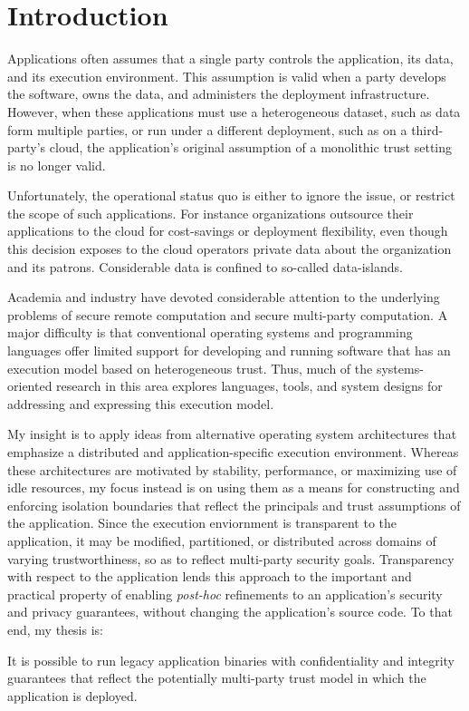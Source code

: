 \section{Introduction}
\label{sec:intro}

Applications often assumes that a single party controls the application, its
data, and its execution environment.
%
This assumption is valid when a party develops the software, owns the data, 
and administers the deployment infrastructure.
%
However, when these applications must use a heterogeneous dataset,
such as data form multiple parties, or run under a different deployment, such
as on a third-party's cloud, the application's original assumption of a
monolithic trust setting is no longer valid.


Unfortunately, the operational status quo is either to ignore the issue, or
restrict the scope of such applications.  
%
For instance organizations outsource their applications to the cloud for
cost-savings or deployment flexibility, even though this decision exposes to
the cloud operators private data about the organization and its patrons.
%
Considerable data is confined to so-called data-islands.



Academia and industry have devoted considerable attention to the underlying
problems of secure remote computation and secure multi-party computation.
%
A major difficulty is that conventional operating systems and
programming languages offer limited support for developing and running software
that has an execution model based on heterogeneous trust.
%
Thus, much of the systems-oriented research in this area explores languages,
tools, and system designs for addressing and expressing this execution model.


My insight is to apply ideas from alternative operating system
architectures that emphasize a distributed and application-specific execution
environment.
%
Whereas these architectures are motivated by stability, performance, or
maximizing use of idle resources, my focus instead is on using them as a means
for constructing and enforcing isolation boundaries that reflect the principals
and trust assumptions of the application.
%
Since the execution enviornment is transparent to the application, 
it may be modified, partitioned, or distributed across domains of varying
trustworthiness, so as to reflect multi-party security goals.
%
Transparency with respect to the application lends this approach to the
important and practical property of enabling \emph{post-hoc} refinements to an
application's security and privacy guarantees, without changing the
application's source code.
To that end, my thesis is:
\begin{displayquote}
    It is possible to run legacy application binaries with confidentiality and 
    integrity guarantees that reflect the potentially multi-party trust model
    in which the application is deployed.
\end{displayquote}


